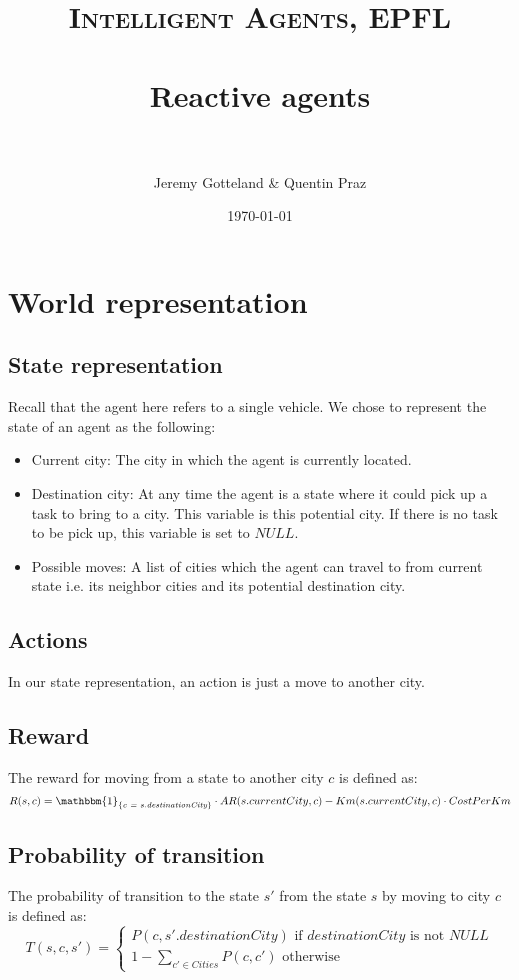 \documentclass[fontsize=12pt]{scrartcl} %
\title{	
\normalfont \normalsize 
\textsc{Intelligent Agents, EPFL} \\ [20pt] %
\horrule{0.5pt} \\[0.4cm] %
\huge Reactive agents \\ %
\horrule{2pt} \\[0.5cm] %
}
\author{Jeremy Gotteland \& Quentin Praz} %
\date{\normalsize\today} %
\begin{document}
\maketitle %


\section*{World representation}
\subsection*{State representation}
Recall that the agent here refers to a single vehicle.
We chose to represent the state of an agent as the following:
\begin{itemize}
\item Current city: The city in which the agent is currently located.
\item Destination city: At any time the agent is a state where it could pick up a task to bring to a city. This variable is this potential city. If there is no task to be pick up, this variable is set to $NULL$.
\item Possible moves: A list of cities which the agent can travel to from current state i.e. its neighbor cities and its potential destination city.
\end{itemize}

\subsection*{Actions}
In our state representation, an action is just a move to another city.

\subsection*{Reward}
The reward for moving from a state to another city $c$ is defined as:
$$
R(s,c) = \mathbbm{1}_{ \{ \textit{c = s.destinationCity} \} } \cdot AR(s.currentCity, c) - Km(s.currentCity, c) \cdot CostPerKm
$$

\subsection*{Probability of transition}
The probability of transition to the state $s'$ from the state $s$ by moving to city $c$ is defined as:
$$
T(s,c,s') = 
\left\{
\begin{array}{l}
 P(c, s'.destinationCity) \text{ if $destinationCity$ is not $NULL$}\\
 1-\sum_{c' \in Cities} P(c,c') \text{ otherwise}
\end{array}
\right.
$$
\end{document}
